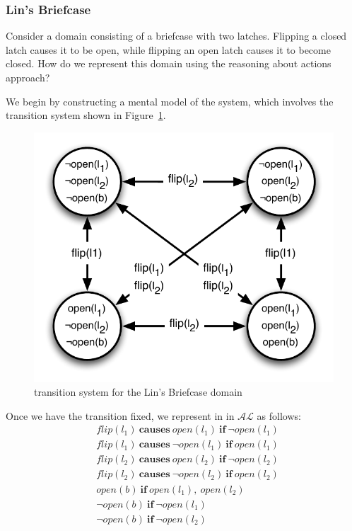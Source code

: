 \documentclass{article}
\newcommand{\AL}{\ensuremath{\mathcal{AL}}}
\newcommand{\dynamiclawp}[3]{\ensuremath{#1 \: \mathbf{causes} \: #2 \: \mathbf{if} \: #3}}
\newcommand{\staticlaw}[2]{\ensuremath{#1 \: \mathbf{if} \: #2}}
\begin{document}
\subsubsection{Lin's Briefcase}

Consider a domain consisting of a briefcase with two latches. Flipping a closed latch causes it to be open, while flipping an open latch causes it to become closed. How do we represent this domain using the reasoning about actions approach?

We begin by constructing a mental model of the system, which involves the transition system shown in Figure~\ref{lin-tran}.

\begin{figure}[htb]
    \centering
    \includegraphics[scale=0.50]{briefcase}
    \caption{transition system for the Lin's Briefcase domain}
    \label{lin-tran}
\end{figure}

Once we have the transition fixed, we represent in in $\AL$ as follows:
\begin{align*}
    &\dynamiclawp{flip(l_{1})}{open(l_{1})}{\neg{open(l_{1})}} \\
    &\dynamiclawp{flip(l_{1})}{\neg{open(l_{1})}}{open(l_{1})} \\
    &\dynamiclawp{flip(l_{2})}{open(l_{2})}{\neg{open(l_{2})}} \\
    &\dynamiclawp{flip(l_{2})}{\neg{open(l_{2})}}{open(l_{2})} \\
    &\staticlaw{open(b)}{open(l_{1}),\:open(l_{2})} \\
    &\staticlaw{\neg{open(b)}}{\neg{open(l_{1})}} \\
    &\staticlaw{\neg{open(b)}}{\neg{open(l_{2})}}
\end{align*}
\end{document}
